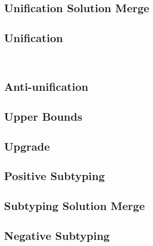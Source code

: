 \documentclass[a4,natbib=false]{article}
\begin{document}
\subsection{Unification Solution Merge}


\subsection{Unification}
\

\subsection{Anti-unification}


\subsection{Upper Bounds}


\subsection{Upgrade}


\subsection{Positive Subtyping}


\subsection{Subtyping Solution Merge}


\subsection{Negative Subtyping}

\end{document}
